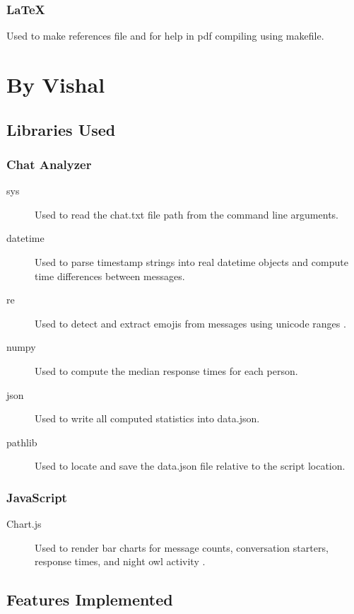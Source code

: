 \documentclass{report}
\begin{document}
\subsection{LaTeX}
Used \cite{gemini} to make references file and for help in pdf compiling using makefile.

\chapter{By Vishal}

\section{Libraries Used}

\subsection{Chat Analyzer}
\begin{description}
  \item[sys] Used to read the chat.txt file path from the command line arguments.
  \item[datetime] Used to parse timestamp strings into real datetime objects and compute time differences between messages.
  \item[re] Used to detect and extract emojis from messages using unicode ranges \cite{pythondocs}.
  \item[numpy] Used to compute the median response times for each person.
  \item[json] Used to write all computed statistics into data.json.
  \item[pathlib] Used to locate and save the data.json file relative to the script location.
\end{description}

\subsection{JavaScript}
\begin{description}
  \item[Chart.js] Used to render bar charts for message counts, conversation starters, response times, and night owl activity \cite{chartjs}.
\end{description}

\section{Features Implemented}
\end{document}
